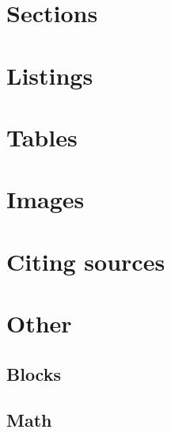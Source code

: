 \documentclass[10pt,xcolor=x11names,compress,fleqn]{beamer}
\begin{document}
  
  
  
  \section{Sections}  
  
  
  
  \section{Listings}  
  
  
  \section{Tables}
  
  
  \section{Images}
  
  
  \section{Citing sources}
  
  
  \section{Other}
  
  \subsection{Blocks}
  
  
  \subsection{Math}
  
  
\end{document}
